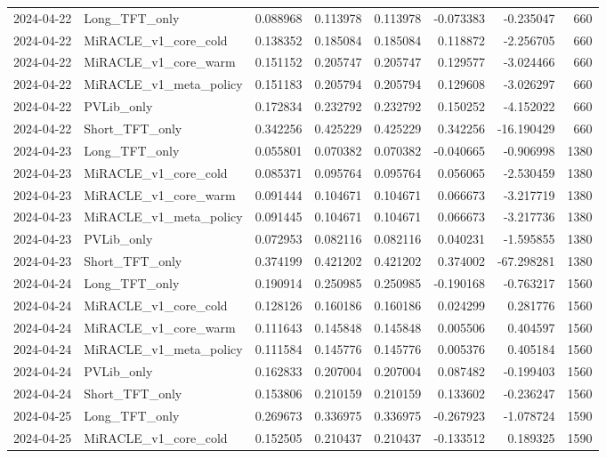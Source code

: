 \begin{tabular}{llrrrrrr}
2024-04-22 & Long_TFT_only & 0.088968 & 0.113978 & 0.113978 & -0.073383 & -0.235047 & 660 \\
2024-04-22 & MiRACLE_v1_core_cold & 0.138352 & 0.185084 & 0.185084 & 0.118872 & -2.256705 & 660 \\
2024-04-22 & MiRACLE_v1_core_warm & 0.151152 & 0.205747 & 0.205747 & 0.129577 & -3.024466 & 660 \\
2024-04-22 & MiRACLE_v1_meta_policy & 0.151183 & 0.205794 & 0.205794 & 0.129608 & -3.026297 & 660 \\
2024-04-22 & PVLib_only & 0.172834 & 0.232792 & 0.232792 & 0.150252 & -4.152022 & 660 \\
2024-04-22 & Short_TFT_only & 0.342256 & 0.425229 & 0.425229 & 0.342256 & -16.190429 & 660 \\
2024-04-23 & Long_TFT_only & 0.055801 & 0.070382 & 0.070382 & -0.040665 & -0.906998 & 1380 \\
2024-04-23 & MiRACLE_v1_core_cold & 0.085371 & 0.095764 & 0.095764 & 0.056065 & -2.530459 & 1380 \\
2024-04-23 & MiRACLE_v1_core_warm & 0.091444 & 0.104671 & 0.104671 & 0.066673 & -3.217719 & 1380 \\
2024-04-23 & MiRACLE_v1_meta_policy & 0.091445 & 0.104671 & 0.104671 & 0.066673 & -3.217736 & 1380 \\
2024-04-23 & PVLib_only & 0.072953 & 0.082116 & 0.082116 & 0.040231 & -1.595855 & 1380 \\
2024-04-23 & Short_TFT_only & 0.374199 & 0.421202 & 0.421202 & 0.374002 & -67.298281 & 1380 \\
2024-04-24 & Long_TFT_only & 0.190914 & 0.250985 & 0.250985 & -0.190168 & -0.763217 & 1560 \\
2024-04-24 & MiRACLE_v1_core_cold & 0.128126 & 0.160186 & 0.160186 & 0.024299 & 0.281776 & 1560 \\
2024-04-24 & MiRACLE_v1_core_warm & 0.111643 & 0.145848 & 0.145848 & 0.005506 & 0.404597 & 1560 \\
2024-04-24 & MiRACLE_v1_meta_policy & 0.111584 & 0.145776 & 0.145776 & 0.005376 & 0.405184 & 1560 \\
2024-04-24 & PVLib_only & 0.162833 & 0.207004 & 0.207004 & 0.087482 & -0.199403 & 1560 \\
2024-04-24 & Short_TFT_only & 0.153806 & 0.210159 & 0.210159 & 0.133602 & -0.236247 & 1560 \\
2024-04-25 & Long_TFT_only & 0.269673 & 0.336975 & 0.336975 & -0.267923 & -1.078724 & 1590 \\
2024-04-25 & MiRACLE_v1_core_cold & 0.152505 & 0.210437 & 0.210437 & -0.133512 & 0.189325 & 1590 \\

\end{tabular}
